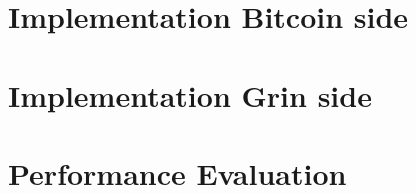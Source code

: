 \section{Implementation Bitcoin side}\label{secImplBtc}
\section{Implementation Grin side}\label{secImplGrn}
\section{Performance Evaluation}\label{secImplPerf}